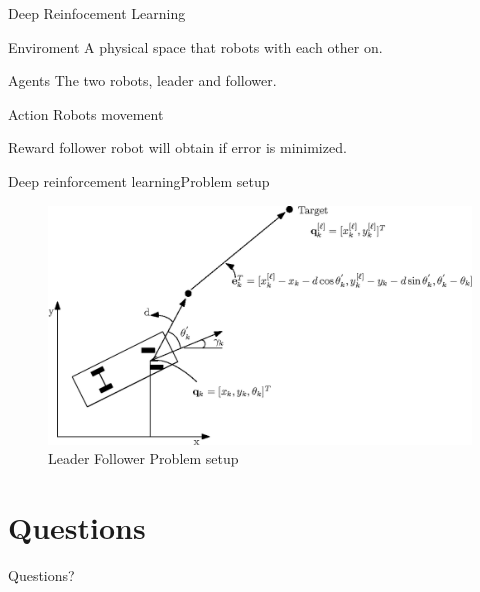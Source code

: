 \documentclass{beamer}
\begin{document}
\begin{frame}{Deep Reinfocement Learning}
\begin{block}{Enviroment}
A physical space that robots with each other on.
\end{block}
\begin{block}{Agents}
The two robots, leader and follower.
\end{block}
\begin{block}{Action}
Robots movement
\end{block}
\begin{block}{Reward}
follower robot will obtain if error is minimized.
\end{block}
\end{frame}

\begin{frame}{Deep reinforcement learning}{Problem setup}
\begin{center}
\begin{figure}
\includegraphics[scale=0.8]{figs/img/LF-Setup.eps}
\caption{Leader Follower Problem setup}
\end{figure}
\end{center}
\end{frame}
\section*{Questions}
\begin{frame}
\begin{LARGE}
\begin{center}
Questions?
\end{center}
\end{LARGE}
\end{frame}
\end{document}
